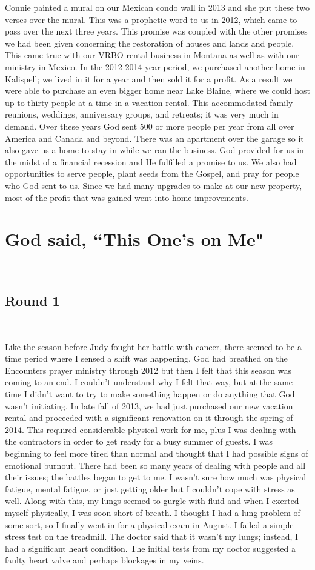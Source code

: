 \documentclass[oneside,12pt]{book}
\begin{document}
Connie painted a mural on our Mexican condo wall in 2013 and she put these two verses over the mural. This was a prophetic word to us in 2012, which came to pass over the next three years. This promise was coupled with the other promises we had been given concerning the restoration of houses and lands and people. This came true with our VRBO rental business in Montana as well as with our ministry in Mexico. In the 2012-2014 year period, we purchased another home in Kalispell; we lived in it for a year and then sold it for a profit. As a result we were able to purchase an even bigger home near Lake Blaine, where we could host up to thirty people at a time in a vacation rental. This accommodated family reunions, weddings, anniversary groups, and retreats; it was very much in demand. Over these years God sent 500 or more people per year from all over America and Canada and beyond. There was an apartment over the garage so it also gave us a home to stay in while we ran the business. God provided for us in the midst of a financial recession and He fulfilled a promise to us. We also had opportunities to serve people, plant seeds from the Gospel, and pray for people who God sent to us. Since we had many upgrades to make at our new property, most of the profit that was gained went into home improvements. 


\chapter{God said, ``This One's on Me"}
\

\section*{Round 1}
\

Like the season before Judy fought her battle with cancer, there seemed to be a time period where I sensed a shift was happening. God had breathed on the Encounters prayer ministry through 2012 but then I felt that this season was coming to an end. I couldn't understand why I felt that way, but at the same time I didn't want to try to make something happen or do anything that God wasn't initiating. In late fall of 2013, we had just purchased our new vacation rental and proceeded with a significant renovation on it through the spring of 2014. This required considerable physical work for me, plus I was dealing with the contractors in order to get ready for a busy summer of guests. I was beginning to feel more tired than normal and thought that I had possible signs of emotional burnout. There had been so many years of dealing with people and all their issues; the battles began to get to me. I wasn't sure how much was physical fatigue, mental fatigue, or just getting older but I couldn't cope with stress as well. Along with this, my lungs seemed to gurgle with fluid and when I exerted myself physically, I was soon short of breath. I thought I had a lung problem of some sort, so I finally went in for a physical exam in August. I failed a simple stress test on the treadmill. The doctor said that it wasn't my lungs; instead, I had a significant heart condition. The initial tests from my doctor suggested a faulty heart valve and perhaps blockages in my veins. 
\end{document}

